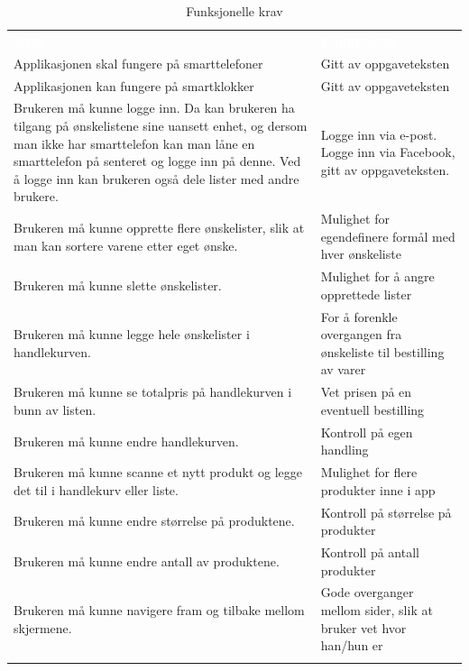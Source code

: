 \begin{table}[H]
    \caption{Funksjonelle krav}
    \label{tab:funksjonelle}
    \centering
    \begin{tabular}{|L{25em} L{18em}|}
    \hline
        \textbf{\textcolor{white}{Krav}} & \textbf{\textcolor{white}{Kommentar}}\\
        Applikasjonen skal fungere på smarttelefoner & Gitt av oppgaveteksten\\
        Applikasjonen kan fungere på smartklokker & Gitt av oppgaveteksten
        \\
        Brukeren må kunne logge inn. Da kan brukeren ha tilgang på ønskelistene sine uansett enhet, og dersom man ikke har smarttelefon kan man låne en smarttelefon på senteret og logge inn på denne. Ved å logge inn kan brukeren også dele lister med andre brukere. & Logge inn via e-post. Logge inn via Facebook, gitt av oppgaveteksten. \\ 
        Brukeren må kunne opprette flere ønskelister, slik at man kan sortere varene etter eget ønske. & Mulighet for egendefinere formål med hver ønskeliste\\
        Brukeren må kunne slette ønskelister. & Mulighet for å angre opprettede lister\\
        Brukeren må kunne legge hele ønskelister i handlekurven. & For å forenkle overgangen fra ønskeliste til bestilling av varer\\
        Brukeren må kunne se totalpris på handlekurven i bunn av listen. & Vet prisen på en eventuell bestilling\\
        Brukeren må kunne endre handlekurven. & Kontroll på egen handling\\
        Brukeren må kunne scanne et nytt produkt og legge det til i handlekurv eller liste. & Mulighet for flere produkter inne i app\\
        Brukeren må kunne endre størrelse på produktene. & Kontroll på størrelse på produkter\\
        Brukeren må kunne endre antall av produktene. & Kontroll på antall produkter\\
        Brukeren må kunne navigere fram og tilbake mellom skjermene. & Gode overganger mellom sider, slik at bruker vet hvor han/hun er\\

\end{tabular}
\end{table}
